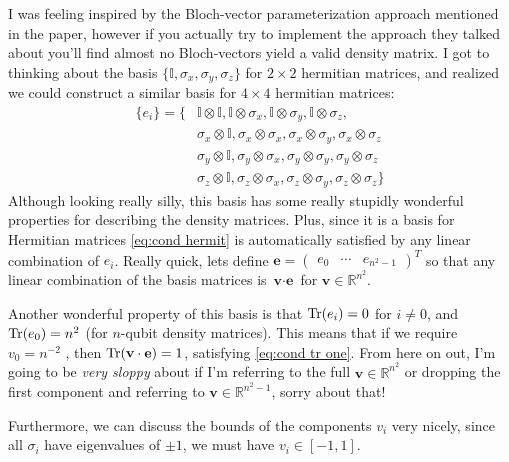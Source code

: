 \documentclass{paper}[11pt]
\newcommand{\bv}[1]{\textbf{#1}}
\newcommand{\I}{\mathbb{I}}
\begin{document}
	I was feeling inspired by the Bloch-vector parameterization approach mentioned in the paper, however if you actually try to implement the approach they talked about you'll find almost no Bloch-vectors yield a valid density matrix. I got to thinking about the basis $\{\mathbb{I}, \sigma_x, \sigma_y, \sigma_z\}$ for $2\times 2$ hermitian matrices, and realized we could construct a similar basis for $4\times 4$ hermitian matrices:
	\begin{align*}
		\{e_i\} = \{&\I\otimes\I, \I\otimes\sigma_x, \I\otimes\sigma_y, \I\otimes\sigma_z, \\
		&\sigma_x\otimes\I, \sigma_x\otimes\sigma_x, \sigma_x\otimes\sigma_y, \sigma_x\otimes\sigma_z \\
		&\sigma_y\otimes\I, \sigma_y\otimes\sigma_x, \sigma_y\otimes\sigma_y, \sigma_y\otimes\sigma_z \\
		&\sigma_z\otimes\I, \sigma_z\otimes\sigma_x, \sigma_z\otimes\sigma_y, \sigma_z\otimes\sigma_z\}
	\end{align*}
	Although looking really silly, this basis has some really stupidly wonderful properties for describing the density matrices. Plus, since it is a basis for Hermitian matrices \cref{eq:cond hermit} is automatically satisfied by any linear combination of $e_i$. Really quick, lets define $\bv{e} = \begin{pmatrix}e_0 & \cdots & e_{n^2-1}\end{pmatrix}^T$ so that any linear combination of the basis matrices is $\bv{v}\cdot\bv{e}$ for $\bv{v}\in\mathbb{R}^{n^2}$.
		
	Another wonderful property of this basis is that $\Tr(e_i)=0$ for $i\neq 0$, and $\Tr(e_0)=n^2$ (for $n$-qubit density matrices). This means that if we require $v_0=n^{-2}$ , then $\Tr(\bv{v}\cdot\bv{e})=1$, satisfying \cref{eq:cond tr one}. From here on out, I'm going to be \textit{very sloppy} about if I'm referring to the full $\bv{v}\in\mathbb{R}^{n^2}$ or dropping the first component and referring to $\bv{v}\in\mathbb{R}^{n^2-1}$, sorry about that!
	
	Furthermore, we can discuss the bounds of the components $v_i$ very nicely, since all $\sigma_i$ have eigenvalues of $\pm 1$, we must have $v_i\in[-1,1]$.
	
\end{document}
